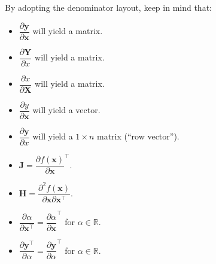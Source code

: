 \documentclass{article}
\begin{document}
By adopting the denominator layout, keep in mind that:
\begin{itemize}
    \item \(\dfrac{\partial \mathbf{y}}{\partial \mathbf{x}}\) will yield a matrix.
    \item \(\dfrac{\partial \mathbf{Y}}{\partial x}\) will yield a matrix.
    \item \(\dfrac{\partial x}{\partial \mathbf{X}}\) will yield a matrix.
    \item \(\dfrac{\partial y}{\partial \mathbf{x}}\) will yield a vector.
    \item \(\dfrac{\partial \mathbf{y}}{\partial x}\) will yield a \(1\times n\) matrix (``row vector'').
    \item \(\mathbf{J} = \dfrac{\partial f(\mathbf{x})}{\partial \mathbf{x}}^\top\).
    \item \(\mathbf{H} = \dfrac{\partial^{2} f(\mathbf{x})}{\partial\mathbf{x}\partial\mathbf{x}^\top}\).
    \item \(\dfrac{\partial\alpha}{\partial \mathbf{x}^\top} = \dfrac{\partial\alpha}{\partial \mathbf{x}}^\top\) for \(\alpha\in \mathbb{R}\).
    \item \(\dfrac{\partial \mathbf{y}^\top}{\partial \alpha} = \dfrac{\partial \mathbf{y}}{\partial \alpha}^\top\) for \(\alpha\in \mathbb{R}\).
\end{itemize}
\end{document}

